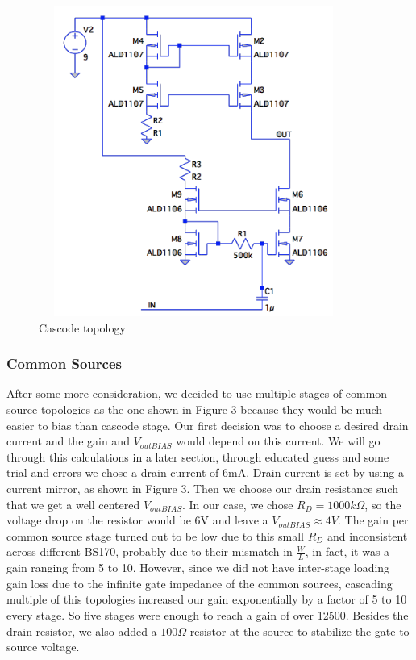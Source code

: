 \documentclass[11pt, twoside, letterpaper]{article}
\begin{document}
\begin{figure}[htbp]
\begin{center}
\includegraphics[width=4in,height=4in]{Cascode.png}
\caption{Cascode topology}
\end{center}
\end{figure}
\FloatBarrier

\subsubsection{Common Sources}
After some more consideration, we decided to use multiple stages of common source topologies as the one shown in Figure 3 because they would 
be much easier to bias than cascode stage. Our first decision was to choose a desired drain current and the gain and $V_{outBIAS}$
would depend on this current. We will go through this calculations in a later section, through educated guess and some trial and errors we 
chose a drain current of 6mA. Drain current is set by using a current mirror, as shown in Figure 3. Then we choose our drain 
resistance such that we get a well centered $V_{outBIAS}$. In our case, we chose $R_D=1000k\Omega$, so the voltage drop on the resistor would be 
6V and leave a $V_{outBIAS}\approx 4V$. The gain per common source stage turned out to be low due to this small $R_D$ and inconsistent across different 
BS170, probably due to their mismatch in $\frac{W}{L}$, in fact, it was a gain ranging from 5 to 10. However, since we did not have inter-stage loading 
gain loss due to the infinite gate impedance of the common sources, cascading multiple of this topologies increased our gain exponentially by a factor
of 5 to 10 every stage. So five stages were enough to reach a gain of over 12500. Besides the drain resistor, we also added a $100\Omega$ resistor 
at the source to stabilize the gate to source voltage.
\end{document}
